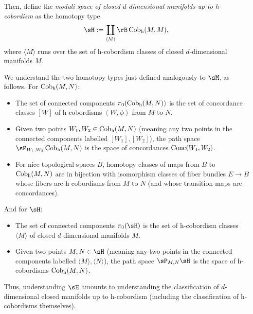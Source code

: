 \begin{nothing}
\begin{subdefinition}
    Then, define the \emph{moduli space of closed $d$-dimensional manifolds up to h-cobordism} as the homotopy type
    \[
      \sH \ce \coprod_{\langle M \rangle} \rB \hCob(M,M),
    \]
    where $\langle M \rangle$ runs over the set of h-cobordism classes of closed $d$-dimensional manifolds $M$.
  \end{subdefinition}

  \begin{subremark}
    \label{manfiolds-simplify-moduli-unwrap}
    We understand the two homotopy types just defined analogously to $\sM$, as follows. For $\operatorname{Cob_h}(M,N)$:
    \begin{itemize}
    \item The set of connected components $\pi_0(\operatorname{Cob_h}(M,N))$ is the set of concordance classes $[W]$ of h-cobordisms $(W,\phi)$ from $M$ to $N$.
    \item Given two points $W_1,W_2 \in \operatorname{Cob_h}(M,N)$ (meaning any two points in the connected components labelled $[W_1],[W_2]$), the path space $\sP_{W_1,W_2}\hCob(M,N)$ is the space of concordances $\operatorname{Conc}(W_1,W_2)$.
    \item For nice topological spaces $B$, homotopy classes of maps from $B$ to $\operatorname{Cob_h}(M,N)$ are in bijection with isomorphism classes of fiber bundles $E \to B$ whose fibers are h-cobordisms from $M$ to $N$ (and whose transition maps are concordances).
    \end{itemize}
    And for $\sH$:
    \begin{itemize}
    \item The set of connected components $\pi_0(\sH)$ is the set of h-cobordism classes $\langle M \rangle$ of closed $d$-dimensional manifolds $M$.
    \item Given two points $M,N \in \sH$ (meaning any two points in the connected components labelled $\langle M \rangle,\langle N \rangle$), the path space $\sP_{M,N}\sH$ is the space of h-cobordisms $\operatorname{Cob_h}(M,N)$.
    \end{itemize}
    Thus, understanding $\sH$ amounts to understanding the classification of $d$-dimensional closed manifolds up to h-cobordism (including the classification of h-cobordisms themselves).
  \end{subremark}
\end{nothing}

